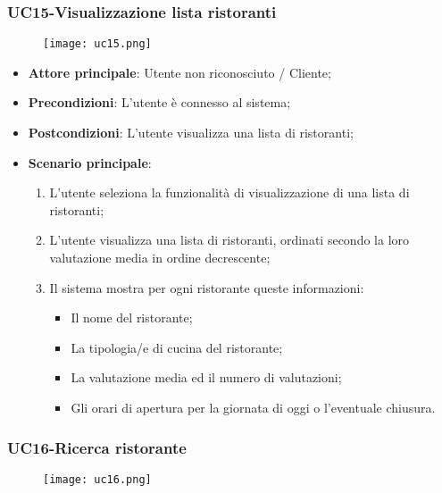 \nonstopmode
\pagebreak
\subsubsection{UC15-Visualizzazione lista ristoranti}
\begin{figure}[h] \texttt{[image: uc15.png]} \end{figure}

\begin{itemize}
\item \textbf{Attore principale}: Utente non riconosciuto / Cliente;
\item \textbf{Precondizioni}: L'utente è connesso al sistema;
\item \textbf{Postcondizioni}: L'utente visualizza una lista di ristoranti;
\item \textbf{Scenario principale}:
\begin{enumerate}
\item L'utente seleziona la funzionalità di visualizzazione di una lista di ristoranti;
\item L'utente visualizza una lista di ristoranti, ordinati secondo la loro valutazione media in ordine decrescente;
\item Il sistema mostra per ogni ristorante queste informazioni:
\begin{itemize}
\item Il nome del ristorante;
\item La tipologia/e di cucina del ristorante;
\item La valutazione media ed il numero di valutazioni;
\item Gli orari di apertura per la giornata di oggi o l'eventuale chiusura.
\end{itemize}
\end{enumerate}
\end{itemize}

\pagebreak
\subsubsection{UC16-Ricerca ristorante}
\begin{figure}[h] \texttt{[image: uc16.png]} \end{figure}

